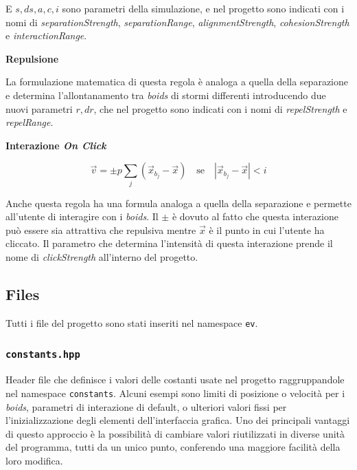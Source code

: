 \documentclass[10pt,a4paper]{article}
\begin{document}
E $s, ds, a, c, i$ sono parametri della simulazione, e nel progetto sono indicati con i nomi di \textit{separationStrength}, \textit{separationRange}, \textit{alignmentStrength}, \textit{cohesionStrength} e \textit{interactionRange}.

\vspace{2mm}

\textbf{Repulsione}

La formulazione matematica di questa regola è analoga a quella della separazione e determina l'allontanamento tra \textit{boids} di stormi differenti introducendo due nuovi parametri $r, dr$, che nel progetto sono indicati con i nomi di \textit{repelStrength} e \textit{repelRange}.

\vspace{2mm}

\textbf{Interazione \textit{On Click}}

\begin{equation*}
    \vec{v} = \pm p \sum_{j} (\vec{x}_{b_j} - \vec{x}) \quad \text{se} \quad \left| \vec{x}_{b_j} - \vec{x} \right| < i
\end{equation*}

Anche questa regola ha una formula analoga a quella della separazione e permette all'utente di interagire con i \textit{boids}. Il $\pm$ è dovuto al fatto che questa interazione può essere sia attrattiva che repulsiva mentre $\vec{x}$ è il punto in cui l'utente ha cliccato. Il parametro che determina l'intensità di questa interazione prende il nome di \textit{clickStrength} all'interno del progetto.

\newpage

\subsection{Files}

Tutti i file del progetto sono stati inseriti nel namespace \texttt{ev}.

\subsubsection{\texttt{constants.hpp}}

Header file che definisce i valori delle costanti usate nel progetto raggruppandole nel namespace \texttt{constants}. Alcuni esempi sono limiti di posizione o velocità per i \textit{boids}, parametri di interazione di default, o ulteriori valori fissi per l'inizializzazione degli elementi dell'interfaccia grafica. Uno dei principali vantaggi di questo approccio è la possibilità di cambiare valori riutilizzati in diverse unità del programma, tutti da un unico punto, conferendo una maggiore facilità della loro modifica.
\end{document}
